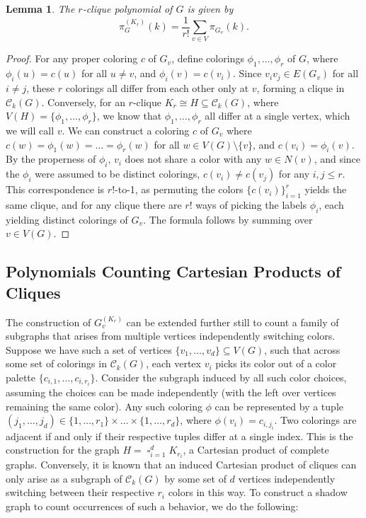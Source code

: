 \documentclass[12pt,reqno,dvipsnames]{amsart}
\newtheorem{lemma}[theorem]{Lemma}
\theoremstyle{definition}
\begin{document}
\begin{lemma}\label{lem:cliques}
The $r$-clique polynomial of $G$ is given by
$$
\pi_G^{(K_r)}(k) = \frac{1}{r!} \sum_{v \in V} \pi_{G_v}(k).
$$
\end{lemma}

\begin{proof}
For any proper coloring $c$ of $G_v$, define colorings $\phi_1,\ldots,\phi_r$ of $G$, where $\phi_i(u)=c(u)$ for all $u\neq v$, and $\phi_i(v)=c(v_i)$. Since $v_iv_j \in E(G_v)$ for all $i\neq j$, these $r$ colorings all differ from each other only at $v$, forming a clique in $\mathcal{C}_k(G)$. Conversely, for an $r$-clique $K_r\cong H\subseteq \mathcal{C}_k(G)$, where $V(H)=\{\phi_1,\dots,\phi_r\}$, we know that $\phi_1,\dots,\phi_r$ all differ at a single vertex, which we will call $v$. We can construct a coloring $c$ of $G_v$ where $c(w)=\phi_1(w)=\dots=\phi_r(w)$ for all $w \in V(G)\setminus \{v\}$, and $c(v_i)=\phi_i(v)$. By the properness of $\phi_i$, $v_i$ does not share a color with any $w\in N(v)$, and since the $\phi_i$ were assumed to be distinct colorings, $c(v_i)\ne c(v_j)$ for any $i,j\le r$. This correspondence is $r!$-to-1, as permuting the colors $\{c(v_i)\}_{i=1}^r$ yields the same clique, and for any clique there are $r!$ ways of picking the labels $\phi_i$, each yielding distinct colorings of $G_v$. The formula follows by summing over $v \in V(G)$.
\end{proof}

\subsection{Polynomials Counting Cartesian Products of Cliques}\label{subsec:cartesian}
The construction of $G_v^{(K_r)}$ can be extended further still to count a family of subgraphs that arises from multiple vertices independently switching colors. Suppose we have such a set of vertices $\{v_1,\dots,v_d\}\subseteq V(G)$, such that across some set of colorings in $\mathcal{C}_k(G)$, each vertex $v_i$ picks its color out of a color palette $\{c_{i,1},\dots,c_{i,r_i}\}$. Consider the subgraph induced by all such color choices, assuming the choices can be made independently (with the left over vertices remaining the same color). Any such coloring $\phi$ can be represented by a tuple $(j_1,\dots,j_d)\in \{1,\dots,r_1\}\times\dots\times\{1,\dots,r_d\}$, where $\phi(v_i)=c_{i,j_i}$. Two colorings are adjacent if and only if their respective tuples differ at a single index. This is the construction for the graph $H=\mathop{\square}_{i=1}^d K_{r_i}$, a Cartesian product of complete graphs. Conversely, it is known that an induced Cartesian product of cliques can only arise as a subgraph of $\mathcal{C}_k(G)$ by some set of $d$ vertices independently switching between their respective $r_i$ colors in this way. To construct a shadow graph to count occurrences of such a behavior, we do the following:
\end{document}
